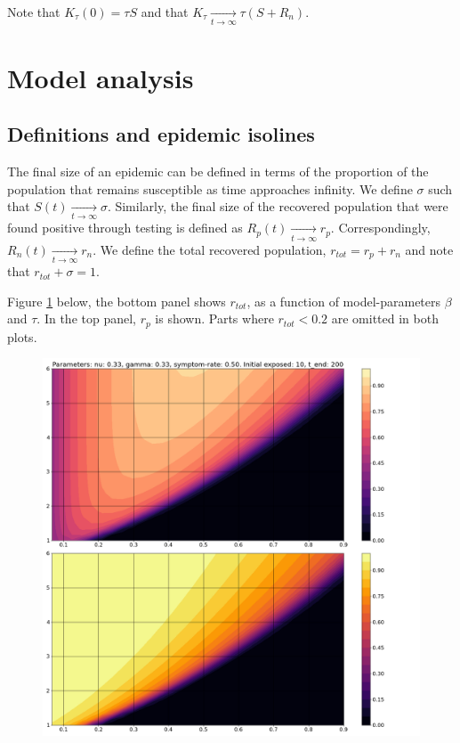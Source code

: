 \documentclass[10pt,a4paper]{article}
\begin{document}
Note that $K_{\tau}(0) = \tau S$ and that $K_{\tau}  \underset{t \rightarrow \infty }{\longrightarrow} \tau (S+R_n)$. 

\section{Model analysis}
\subsection{Definitions and epidemic isolines}
The final size of an epidemic can be defined in terms of the proportion of the population that remains susceptible as time approaches infinity. 
We define $\sigma$ such that $S(t) \underset{t\rightarrow \infty}{\rightarrow} \sigma$. 
Similarly, the final size of the recovered population that were found positive through testing is defined as $R_p(t) \underset{t\rightarrow \infty}{\rightarrow} r_p$. 
Correspondingly, $R_n(t) \underset{t\rightarrow \infty}{\rightarrow} r_n$.  
We define the total recovered population, $r_{tot} = r_p + r_n$ and note that $r_{tot} + \sigma = 1$.

Figure \ref{fig:TestAndBeta} below, the bottom panel shows $r_{tot}$, as a function of model-parameters $\beta$ and $\tau$. 
In the top panel, $r_p$ is shown. Parts where $r_{tot} < 0.2$ are omitted in both plots.

\begin{figure}[h]\centering
    \includegraphics[width = \linewidth]{./../Figures/TestingModelling_TestProbAndInfectivity_Split.png}
    \caption{ }\label{fig:TestAndBeta}
\end{figure}
\end{document}
